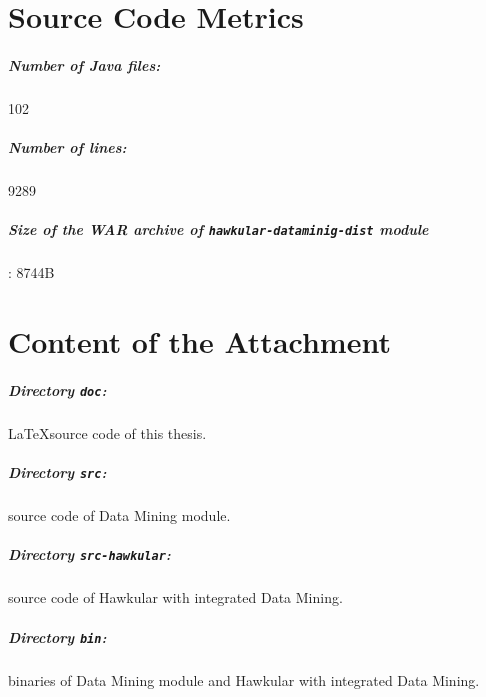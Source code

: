 \chapter{Source Code Metrics}
    \paragraph*{Number of Java files:} 102
    \paragraph*{Number of lines:} 9289
    \paragraph*{Size of the WAR archive of \texttt{hawkular-dataminig-dist} module} : 8744B

\chapter{Content of the Attachment}
    \paragraph*{Directory \texttt{doc}:} \LaTeX source code of this thesis.
    \paragraph*{Directory \texttt{src}:} source code of Data Mining module.
    \paragraph*{Directory \texttt{src-hawkular}:} source code of Hawkular with integrated Data Mining.
    \paragraph*{Directory \texttt{bin}:} binaries of Data Mining module and Hawkular with integrated Data Mining.
